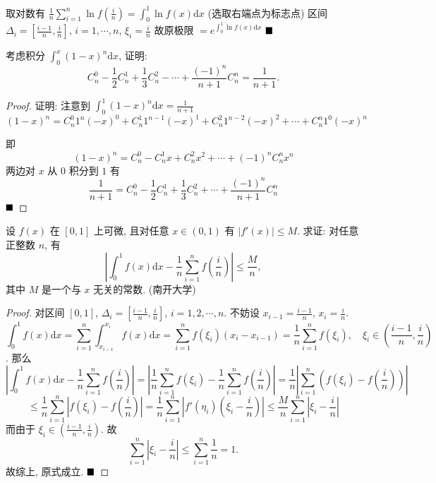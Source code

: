 \documentclass[lang=cn,newtx,10pt,scheme=chinese]{elegantbook}
\begin{document}
\begin{solution}
取对数有 $\frac{1}{n} \sum_{i=1}^{n} \ln f\left(\frac{i}{n}\right) = \int_{0}^{1} \ln f(x) \mathrm{d}x$ (选取右端点为标志点)
区间 $\Delta_i = \left[\frac{i-1}{n}, \frac{i}{n}\right]$, $i=1, \cdots, n$, $\xi_i = \frac{i}{n}$
故原极限 $= e^{\int_{0}^{1} \ln f(x) \mathrm{d}x}$
$\hfill \blacksquare$
\end{solution}


\begin{problem}[$\bigstar$]
考虑积分 $\int_{0}^{x} (1-x)^n \mathrm{d}x$, 证明:
$$ C_n^0 - \frac{1}{2}C_n^1 + \frac{1}{3}C_n^2 - \cdots + \frac{(-1)^n}{n+1}C_n^n = \frac{1}{n+1}. $$
\end{problem}

\begin{proof}
证明: 注意到 $\int_{0}^{1} (1-x)^n \mathrm{d}x = \frac{1}{n+1}$
$$(1-x)^n = C_n^0 1^n (-x)^0 + C_n^1 1^{n-1} (-x)^1 + C_n^2 1^{n-2} (-x)^2 + \cdots + C_n^n 1^0 (-x)^n$$

即$$(1-x)^n = C_n^0 - C_n^1 x + C_n^2 x^2 + \cdots + (-1)^n C_n^n x^n$$
两边对 $x$ 从 $0$ 积分到 $1$ 有 $$\frac{1}{n+1} = C_n^0 - \frac{1}{2}C_n^1 + \frac{1}{3}C_n^2 + \cdots + \frac{(-1)^n}{n+1}C_n^n$$
$\hfill \blacksquare$
\end{proof}

\begin{problem}[$\bigstar$]
设 $f(x)$ 在 $[0,1]$ 上可微, 且对任意 $x \in (0,1)$ 有 $|f'(x)| \le M$. 求证: 对任意正整数 $n$, 有
$$ \left| \int_{0}^{1} f(x) \mathrm{d}x - \frac{1}{n} \sum_{i=1}^{n} f\left(\frac{i}{n}\right) \right| \le \frac{M}{n}, $$
其中 $M$ 是一个与 $x$ 无关的常数. (南开大学)
\end{problem}

\begin{proof}
对区间 $[0,1]$, $\Delta_i = \left[\frac{i-1}{n}, \frac{i}{n}\right]$, $i=1,2,\cdots,n$. 不妨设 $x_{i-1} = \frac{i-1}{n}$, $x_i = \frac{i}{n}$.
$$\int_{0}^{1} f(x) \mathrm{d}x = \sum_{i=1}^{n} \int_{x_{i-1}}^{x_i} f(x) \mathrm{d}x = \sum_{i=1}^{n} f(\xi_i) (x_i - x_{i-1}) = \frac{1}{n} \sum_{i=1}^{n} f(\xi_i), \quad \xi_i \in \left(\frac{i-1}{n},  \frac{i}{n}\right)$$.
那么 $$\left| \int_{0}^{1} f(x) \mathrm{d}x - \frac{1}{n} \sum_{i=1}^{n} f\left(\frac{i}{n}\right) \right| = \left| \frac{1}{n} \sum_{i=1}^{n} f(\xi_i) - \frac{1}{n} \sum_{i=1}^{n} f\left(\frac{i}{n}\right) \right| = \frac{1}{n} \left| \sum_{i=1}^{n} \left(f(\xi_i) - f\left(\frac{i}{n}\right)\right) \right|$$
$$\le \frac{1}{n} \sum_{i=1}^{n} \left| f(\xi_i) - f\left(\frac{i}{n}\right) \right| = \frac{1}{n} \sum_{i=1}^{n} \left| f'(\eta_i) \left(\xi_i - \frac{i}{n}\right) \right| \le \frac{M}{n} \sum_{i=1}^{n} \left|\xi_i - \frac{i}{n}\right|$$
而由于 $\xi_i \in \left(\frac{i-1}{n}, \frac{i}{n}\right)$. 故 $$\sum_{i=1}^{n} \left|\xi_i - \frac{i}{n}\right| \le \sum_{i=1}^{n} \frac{1}{n} = 1.$$ 故综上, 原式成立.
$\hfill \blacksquare$
\end{proof}
\end{document}
